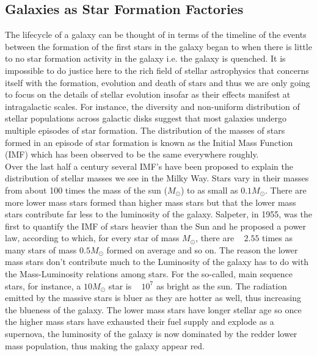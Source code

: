 \subsection{Galaxies as Star Formation Factories}

The lifecycle of a galaxy can be thought of in terms of the timeline of the events between the formation of the first stars in the galaxy began to when there is little to no star formation activity in the galaxy i.e. the galaxy is quenched. It is impossible to do justice here to the rich field of stellar astrophysics that concerns itself with the formation, evolution and death of stars and thus we are only going to focus on the details of stellar evolution insofar as their effects manifest at intragalactic scales. For instance, the diversity and non-uniform distribution of stellar populations across galactic disks suggest that most galaxies undergo multiple episodes of star formation. The distribution of the masses of stars formed in an episode of star formation is known as the Initial Mass Function (IMF) which has been observed to be the same everywhere roughly.\\

Over the last half a century several IMF's have been proposed to explain the distribution of stellar masses we see in the Milky Way. Stars vary in their masses from about 100 times the mass of the sun ($M_{\odot}$) to as small as $0.1M_{\odot}$. There are more lower mass stars formed than higher mass stars but that the lower mass stars contribute far less to the luminosity of the galaxy. Salpeter, in 1955, was the first to quantify the IMF \citep{1955ApJ...121..161S} of stars heavier than the Sun and he proposed a power law, according to which, for every star of mass $M_{\odot}$, there are ~ $2.55$ times as many stars of mass $0.5M_{\odot}$  formed on average and so on. The reason the lower mass stars don't contribute much to the Luminosity of the galaxy has to do with the Mass-Luminosity relations among stars. For the so-called, main sequence stars, for instance, a $10M_{\odot}$ star is ~ $10^{7}$ as bright as the sun. The radiation emitted by the massive stars is bluer as they are hotter as well, thus increasing the blueness of the galaxy. The lower mass stars have longer stellar age so once the higher mass stars have exhausted their fuel supply and explode as a supernova, the luminosity of the galaxy is now dominated by the redder lower mass population, thus making the galaxy appear red.\\

